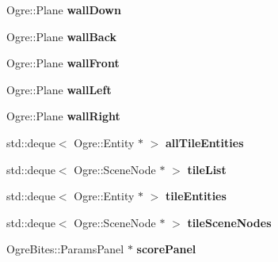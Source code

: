 \begin{DoxyCompactItemize}
\item 
\hypertarget{classTutorialApplication_a9652db59c15fbb6619141e38d77005f2}{Ogre\-::\-Plane {\bfseries wall\-Down}}\label{classTutorialApplication_a9652db59c15fbb6619141e38d77005f2}

\item 
\hypertarget{classTutorialApplication_a1387532b58f56eceaf365b4fa230fb59}{Ogre\-::\-Plane {\bfseries wall\-Back}}\label{classTutorialApplication_a1387532b58f56eceaf365b4fa230fb59}

\item 
\hypertarget{classTutorialApplication_a321066a72f217a549757a66fdc68d9e5}{Ogre\-::\-Plane {\bfseries wall\-Front}}\label{classTutorialApplication_a321066a72f217a549757a66fdc68d9e5}

\item 
\hypertarget{classTutorialApplication_af2221bd61982bdf14e2e6acec011445a}{Ogre\-::\-Plane {\bfseries wall\-Left}}\label{classTutorialApplication_af2221bd61982bdf14e2e6acec011445a}

\item 
\hypertarget{classTutorialApplication_a5c6c734485fe65427f9a21f1c6c68f56}{Ogre\-::\-Plane {\bfseries wall\-Right}}\label{classTutorialApplication_a5c6c734485fe65427f9a21f1c6c68f56}

\item 
\hypertarget{classTutorialApplication_a144302cdbb21d043b2aadc8f80e7bce0}{std\-::deque$<$ Ogre\-::\-Entity $\ast$ $>$ {\bfseries all\-Tile\-Entities}}\label{classTutorialApplication_a144302cdbb21d043b2aadc8f80e7bce0}

\item 
\hypertarget{classTutorialApplication_acb286a9e3da2825e72625158ffe9fcda}{std\-::deque$<$ Ogre\-::\-Scene\-Node $\ast$ $>$ {\bfseries tile\-List}}\label{classTutorialApplication_acb286a9e3da2825e72625158ffe9fcda}

\item 
\hypertarget{classTutorialApplication_a664ba48e57b1a201a7d39e71e87e837a}{std\-::deque$<$ Ogre\-::\-Entity $\ast$ $>$ {\bfseries tile\-Entities}}\label{classTutorialApplication_a664ba48e57b1a201a7d39e71e87e837a}

\item 
\hypertarget{classTutorialApplication_afc73587e688b04c84bac0baa563a1a26}{std\-::deque$<$ Ogre\-::\-Scene\-Node $\ast$ $>$ {\bfseries tile\-Scene\-Nodes}}\label{classTutorialApplication_afc73587e688b04c84bac0baa563a1a26}

\item 
\hypertarget{classTutorialApplication_af95596323c6795ab5d38f8bca97678ba}{Ogre\-Bites\-::\-Params\-Panel $\ast$ {\bfseries score\-Panel}}\label{classTutorialApplication_af95596323c6795ab5d38f8bca97678ba}


\end{DoxyCompactItemize}

